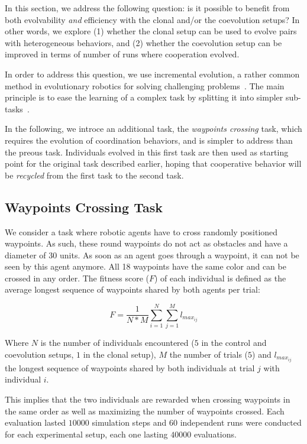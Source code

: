   In this section, we address the following question: is it possible to benefit from both evolvability \textit{and} efficiency with the clonal and/or the coevolution setups? In other words, we explore (1) whether the clonal setup can be used to evolve pairs with heterogeneous behaviors, and (2) whether the coevolution setup can be improved in terms of number of runs where cooperation evolved.

  In order to address this question, we use incremental evolution, a rather common method in evolutionary robotics for solving challenging problems~\parencite{Dorigo1994,Saksida1997,Bongard2008,Doncieux2013}. The main principle is to ease the learning of a complex task by splitting it into simpler sub-tasks~\parencite{Perkins1996}.

  In the following, we introce an additional task, the \textit{waypoints crossing} task, which requires the evolution of coordination behaviors, and is simpler to address than the preous task. Individuals evolved in this first task are then used as starting point for the original task described earlier, hoping that cooperative behavior will be \emph{recycled} from the first task to the second task.
  
  \subsection{Waypoints Crossing Task}  

    We consider a task where robotic agents have to cross randomly positioned waypoints. As such, these round waypoints do not act as obstacles and have a diameter of 30 units. As soon as an agent goes through a waypoint, it can not be seen by this agent anymore. All 18 waypoints have the same color and can be crossed in any order. The fitness score (\(F\)) of each individual is defined as the average longest sequence of waypoints shared by both agents per trial:

    \[
    F = \frac{1}{N*M} \sum_{i=1}^{N} \sum_{j=1}^{M} l_{max_{ij}}
    \]

    Where \(N\) is the number of individuals encountered ($5$ in the control and coevolution setups, $1$ in the clonal setup), \(M\) the number of trials ($5$) and \(l_{max_{ij}}\) the longest sequence of waypoints shared by both individuals at trial \(j\) with individual \(i\).

    This implies that the two individuals are rewarded when crossing waypoints in the same order as well as maximizing the number of waypoints crossed. Each evaluation lasted $10000$ simulation steps and $60$ independent runs were conducted for each experimental setup, each one lasting $40000$ evaluations.

